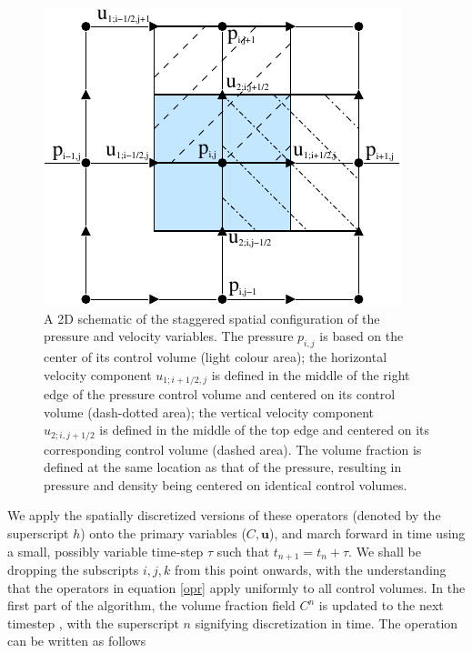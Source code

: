\begin{figure}
\begin{center}
\includegraphics[width=\textwidth]{plots/stag-grid.pdf}
\end{center}
\caption{A 2D schematic of the staggered spatial configuration of the
pressure and velocity variables.
The pressure $p_{i,j}$ is based on the center of its control volume (light colour area);
the horizontal velocity component $u_{1;i+1/2,j}$ is defined in the middle of the
right edge of the pressure control volume and centered on its control volume
(dash-dotted area); the vertical velocity component $u_{2;i,j+1/2}$ is defined in the
middle of the top edge and centered on its corresponding control volume (dashed area).
The volume fraction is defined at the same location as that of the pressure, 
resulting in pressure and density being centered on identical control volumes.  
}
\label{stag-grid}
\end{figure}

We apply the spatially discretized versions of these operators (denoted by the superscript $h$) 
onto the primary variables ($C,\boldsymbol{u}$), and march forward in time using a small, 
possibly variable time-step $\tau$ such that $t_{n+1} = t_{n} + \tau$. 
We shall be dropping the subscripts $i,j,k$ from this point onwards, with the understanding 
that the operators in equation \ref{opr} apply uniformly to all control volumes. 
In the first part of the algorithm, the volume fraction field $C^{n}$ is updated to the next timestep 
, with the superscript $n$ signifying discretization in time. The operation can be written as follows        

